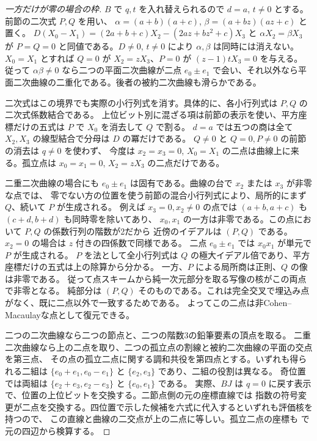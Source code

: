 \begin{proof}[一方だけが零の場合の枠]
$B$ で $q,t$ を入れ替えられるので $d=a$, $t\ne0$ とする。前節の二次式 $P,Q$ を用い、
$\alpha=(a+b)(a+c)$, $\beta=(a+bz)(az+c)$ と置く。
$D(X_0-X_1)=(2a+b+c)X_2-(2az+bz^2+c)X_3$ と $\alpha X_2=\beta X_3$ が
$P=Q=0$ と同値である。$D\ne0$, $t\ne0$ により $\alpha,\beta$ は同時には消えない。
$X_0=X_1$ とすれば $Q=0$ が $X_2=zX_3$、$P=0$ が $(z-1)t X_3=0$ を与える。
従って $\alpha\beta\ne0$ なら二つの平面二次曲線が二点
$e_0\pm e_1$ で会い、それ以外なら平面二次曲線の二重化である。後者の被約二次曲線も滑らかである。

二次式はこの境界でも実際の小行列式を消す。具体的に、各小行列式は $P,Q$ の二次式係数結合である。
上位ビット別に混ざる項は前節の表示を使い、平方座標だけの五式は $P$ で $X_0$ を消去して $Q$ で割る。
$d=a$ では五つの商は全て $X_2,X_3$ の線型結合で分母は $D$ の冪だけである。
$Q\ne0$ と $Q=0,P\ne0$ の前節の消去は $q\ne0$ を使わず、
今度は $x_2=x_3=0$, $X_0=X_1$ の二点は曲線上に来る。孤立点は $x_0=x_1=0$, $X_2=zX_3$ の二点だけである。

二重二次曲線の場合にも $e_0\pm e_1$ は固有である。曲線の台で $x_2$ または $x_3$ が非零な点では、
零でない方の位置を使う前節の混合小行列式により、局所的にまず $Q$、続いて $P$ が生成される。
例えば $x_3=0,x_2\ne0$ の点では $(a+b,a+c)$ も $(c+d,b+d)$ も同時零を除いてあり、
$x_0,x_1$ の一方は非零である。この点において $P,Q$ の係数行列の階数が2だから
近傍のイデアルは $(P,Q)$ である。$x_2=0$ の場合は $z$ 付きの四係数で同様である。
二点 $e_0\pm e_1$ では $x_0x_1$ が単元で $P$ が生成される。
$P$ を法として全小行列式は $Q$ の極大イデアル倍であり、平方座標だけの五式は上の除算から分かる。
一方、$P$ による局所商は正則、$Q$ の像は非零である。
従って点スキームから純一次元部分を取る写像の核がこの両点で非零となる。
純部分は $(P,Q)$ そのものである。これは完全交叉で埋込み点がなく、既に二点以外で一致するためである。
よってこの二点は非Cohen--Macaulayな点として復元できる。

二つの二次曲線なら二つの節点と、二つの階数3の鉛筆要素の頂点を取る。
二重二次曲線なら上の二点を取り、二つの孤立点の割線と被約二次曲線の平面の交点を第三点、
その点の孤立二点に関する調和共役を第四点とする。いずれも得られる二組は
$\{e_0+e_1,e_0-e_1\}$ と $\{e_2,e_3\}$ であり、二組の役割は異なる。
奇位置では両組は $\{e_2+e_3,e_2-e_3\}$ と $\{e_0,e_1\}$ である。
実際、$BJ$ は $q=0$ に戻す表示で、位置の上位ビットを交換する。二節点側の元の座標直線では
指数の符号変更が二点を交換する。四位置で示した候補を六式に代入するといずれも評価核を持つので、
この直線と曲線の二交点が上の二点に等しい。孤立二点の座標も
 で元の四辺から検算する。
\end{proof}

